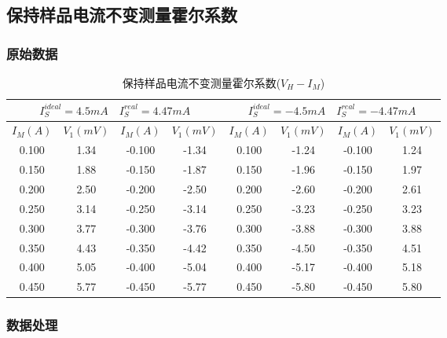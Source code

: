 \documentclass[a4paper]{article}
\begin{document}
    \subsection{保持样品电流不变测量霍尔系数}\label{subsec:2}

    \subsubsection{原始数据}

    \begin{table}[h!]
        \centering
        \caption{保持样品电流不变测量霍尔系数($V_H-I_M$)}
        \begin{tabular}{|c|c|c|c|c|c|c|c|}
            \hline
            \multicolumn{4}{|c|}{$I_S^{ideal}=4.5mA\quad I_S^{real}=4.47mA$} & \multicolumn{4}{|c|}{$I_S^{ideal}=-4.5mA\quad I_S^{real}=-4.47mA$} \\
            \hline
            $I_M(A)$ & $V_1(mV)$ & $I_M(A)$ & $V_1(mV)$ & $I_M(A)$ & $V_1(mV)$ & $I_M(A)$ & $V_1(mV)$ \\
            \hline
            0.100    & 1.34      & -0.100   & -1.34     & 0.100    & -1.24     & -0.100   & 1.24      \\
            \hline
            0.150    & 1.88      & -0.150   & -1.87     & 0.150    & -1.96     & -0.150   & 1.97      \\
            \hline
            0.200    & 2.50      & -0.200   & -2.50     & 0.200    & -2.60     & -0.200   & 2.61      \\
            \hline
            0.250    & 3.14      & -0.250   & -3.14     & 0.250    & -3.23     & -0.250   & 3.23      \\
            \hline
            0.300    & 3.77      & -0.300   & -3.76     & 0.300    & -3.88     & -0.300   & 3.88      \\
            \hline
            0.350    & 4.43      & -0.350   & -4.42     & 0.350    & -4.50     & -0.350   & 4.51      \\
            \hline
            0.400    & 5.05      & -0.400   & -5.04     & 0.400    & -5.17     & -0.400   & 5.18      \\
            \hline
            0.450    & 5.77      & -0.450   & -5.77     & 0.450    & -5.80     & -0.450   & 5.80      \\
            \hline
        \end{tabular}\label{tab:table1}
    \end{table}
    \subsubsection{数据处理}
\end{document}
